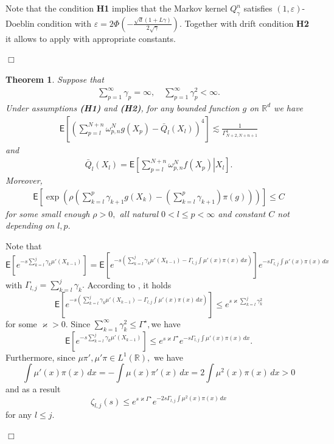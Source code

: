 \documentclass[bj]{imsart}
\newcommand{\proofendsign}{$\Box$}
\newtheorem{thm}{Theorem}
\newenvironment{proof}{{\noindent \bf Proof }}
 {{\hspace*{\fill}\proofendsign\par\bigskip}}
\begin{document}
\begin{proof} Note that the condition {\bf H1} implies that the Markov kernel $Q^n_\gamma$ satisfies $(1,\varepsilon)$-Doeblin condition with $\varepsilon = 2\Phi\left(-\frac{\sqrt{d}(1+L\gamma)}{2\sqrt{\gamma}}\right)$. Together with drift condition {\bf H2} it allows to apply \cite[Theorem~19.4.1]{douc:moulines:priouret:soulier:2018} with appropriate constants. 
\end{proof}


\begin{thm}
\label{exp_mom_ula}
Suppose that
\begin{eqnarray*}
\sum_{p=1}^{\infty} \gamma_p=\infty, \quad \sum_{p=1}^{\infty} \gamma^2_p<\infty.
\end{eqnarray*}
Under assumptions {\bf (H1)} and {\bf (H2)}, for any bounded function $g$ on $\mathbb{R}^d$ 
we have
\begin{eqnarray*}
\mathsf{E}\left[\left(\sum_{p=l}^{N+n}\omega_{p,n}^{N}g(X_{p})-\bar Q_l(X_l)\right)^{4}\right] \lesssim \frac{1}{\Gamma^4_{N+2,N+n+1}}
\end{eqnarray*}
 and
\begin{eqnarray*}
\bar Q_l(X_l)=\mathsf{E}\left[\left.\sum_{p=l}^{N+n}\omega_{p,n}^{N}f(X_{p})\right|X_{l}\right].
\end{eqnarray*}
Moreover, 
\begin{eqnarray*}
\mathsf{E}\left[\exp\left(\rho\left(\sum_{k=l}^{p}\gamma_{k+1}g(X_{k})-\left(\sum_{k=l}^{p}\gamma_{k+1}\right)\pi(g)\right)\right)\right]\leq C
\end{eqnarray*}
for some small enough $\rho>0,$  all natural $0<l\leq p<\infty$ and constant $C$ not depending on $l,p.$
\end{thm}
\begin{proof}
 Note that 
\[
\mathsf{E}\left[e^{-s\sum_{k=l}^{j}\gamma_{k}\mu'(X_{k-1})}\right]=\mathsf{E}\left[e^{-s\left(\sum_{k=l}^{j}\gamma_{k}\mu'(X_{k-1})-\Gamma_{l,j}\int\mu'(x)\pi(x)\,dx\right)}\right]e^{-s\Gamma_{l,j}\int\mu'(x)\pi(x)\,dx}
\]
 with $\Gamma_{l,j}=\sum_{k=l}^{j}\gamma_{k}.$ According to \cite[Theorem~3]{bms:exp_conc_note}, it holds
\[
\mathsf{E}\left[e^{-s\left(\sum_{k=l}^{j}\gamma_{k}\mu'(X_{k-1})-\Gamma_{l,j}\int\mu'(x)\pi(x)\,dx\right)}\right]\leq e^{s\varkappa\sum_{k=l}^{j}\gamma_{k}^{2}}
\]
 for some $\varkappa>0.$ Since $\sum_{k=1}^{\infty}\gamma_{k}^{2}\leq\Gamma^{\star},$we
have 
\[
\mathsf{E}\left[e^{-s\sum_{k=l}^{j}\gamma_{k}\mu'(X_{k-1})}\right]\leq e^{s\varkappa\Gamma^{\star}}e^{-s\Gamma_{l,j}\int\mu'(x)\pi(x)\,dx}.
\]
Furthermore, since $\mu\pi',\mu'\pi\in L^{1}(\mathbb{R}),$ we have
\[
\int\mu'(x)\pi(x)\,dx=-\int\mu(x)\pi'(x)\,dx=2\int\mu^{2}(x)\pi(x)\,dx>0
\]
and as a result 
\[
\zeta_{l,j}(s)\leq e^{s\varkappa\Gamma^{\star}}e^{-2s\Gamma_{l,j}\int\mu^{2}(x)\pi(x)\,dx}
\]
 for any $l\leq j.$
\end{proof}
\end{document}
